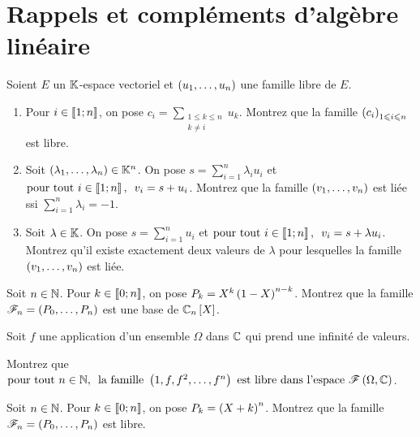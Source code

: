 \chapter{Rappels et compléments d'algèbre linéaire}

\legendeexercices

\begin{exopss}[Exercice 1]
Soient \(E\) un \(\mathbb{K}\)-espace vectoriel et \(\left(u_1,\dots,u_n\right)\) une famille libre de \(E\).

\begin{enumerate}
    \item Pour \(i\in\left\llbracket1;n\right\rrbracket\), on pose \(c_i=\sum_{\substack{1\leq k\leq n \\ k\not=i}}u_k\). Montrez que la famille \(\left(c_i\right)_{1\leqslant i\leqslant n}\) est libre. \\
    \item Soit \(\left(\lambda_1,\dots,\lambda_n\right)\in\mathbb{K}^n\). On pose \(s=\sum_{i=1}^n\lambda_iu_i\) et \(\quantifs{\tpt i\in\interventierii{1}{n}}v_i=s+u_i\). Montrez que la famille \(\left(v_1,\dots,v_n\right)\) est liée ssi \(\sum_{i=1}^n\lambda_i=-1\). \\
    \item Soit \(\lambda\in\mathbb{K}\). On pose \(s=\sum_{i=1}^nu_i\) et \(\quantifs{\tpt i\in\interventierii{1}{n}}v_i=s+\lambda u_i\). Montrez qu'il existe exactement deux valeurs de \(\lambda\) pour lesquelles la famille \(\left(v_1,\dots,v_n\right)\) est liée.
\end{enumerate}
\end{exopss}



\begin{exopss}[Exercice 2]
Soit \(n\in\mathbb{N}\). Pour \(k\in\left\llbracket0;n\right\rrbracket\), on pose \(P_k=X^k\left(1-X\right)^{n-k}\). Montrez que la famille \(\mathscr{F}_n=\left(P_0,\dots,P_n\right)\) est une base de \(\polydeg[\C]{n}\).
\end{exopss}



\begin{exopss}[Exercice 3]
Soit \(f\) une application d'un ensemble \(\Omega\) dans \(\mathbb{C}\) qui prend une infinité de valeurs.

Montrez que \(\quantifs{\tpt n\in\N}\text{la famille }\paren{1,f,f^2,\dots,f^n}\text{ est libre dans l'espace }\F{\Omega}{\C}\).
\end{exopss}



\begin{exopss}[Exercice 4]
Soit \(n\in\mathbb{N}\). Pour \(k\in\left\llbracket0;n\right\rrbracket\), on pose \(P_k=\left(X+k\right)^n\). Montrez que la famille \(\mathscr{F}_n=\left(P_0,\dots,P_n\right)\) est libre.
\end{exopss}



